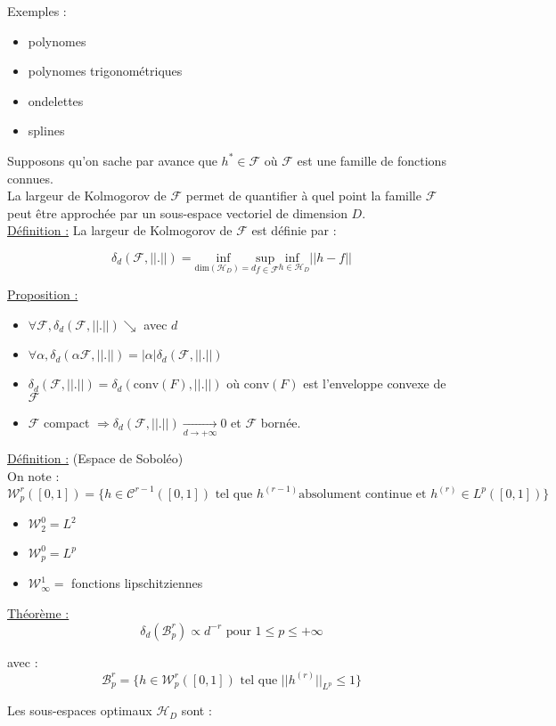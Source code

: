 \documentclass[12pt,a4paper]{article}
\begin{document}
Exemples :
\begin{itemize}
    \item polynomes
    \item polynomes trigonométriques
    \item ondelettes
    \item splines
\end{itemize}

Supposons qu'on sache par avance que $h^* \in \mathcal{F}$ où $\mathcal{F}$ est une famille de fonctions connues.\\

La largeur de Kolmogorov de $\mathcal{F}$ permet de quantifier à quel point la famille $\mathcal{F}$ peut être approchée par un sous-espace vectoriel de dimension $D$.\\

\underline{Définition :} La largeur de Kolmogorov de $\mathcal{F}$ est définie par :

$$
\delta_d(\mathcal{F}, ||.||) = \underset{\text{dim}(\mathcal{H}_D) = d}{\text{inf }} \underset{f \in \mathcal{F}}{\text{sup }} \underset{h \in \mathcal{H}_D}{\text{inf }} ||h - f||
$$


\underline{Proposition :}
\begin{itemize}
    \item $\forall \mathcal{F}, \delta_d(\mathcal{F}, ||.||) \searrow$ avec $d$
    \item $\forall \alpha, \delta_d(\alpha \mathcal{F}, ||.||) = |\alpha| \delta_d(\mathcal{F}, ||.||)$
    \item $\delta_d(\mathcal{F}, ||.||) = \delta_d(\text{conv}(F), ||.||)$ où $\text{conv}(F)$ est l'enveloppe convexe de $\mathcal{F}$
    \item $\mathcal{F}$ compact $\Rightarrow \delta_d(\mathcal{F}, ||.||) \underset{d \rightarrow + \infty}{\rightarrow}0$ et $\mathcal{F}$ bornée.
\end{itemize}

\underline{Définition :} (Espace de Soboléo)\\
On note :
$$
\mathcal{W}_{p}^{r}([0, 1]) = \{h \in \mathcal{C}^{r-1}([0, 1]) \text{ tel que } h^{(r-1)} \text{absolument continue et } h^{(r)} \in L^p([0, 1])\}
$$

\begin{itemize}
    \item $\mathcal{W}_{2}^{0} = L^2$
    \item $\mathcal{W}_{p}^{0} = L^p$
    \item $\mathcal{W}_{\infty}^{1} =$ fonctions lipschitziennes
\end{itemize}


\underline{Théorème :}
$$
\delta_d(\mathcal{B}_{p}^{r}) \propto d^{-r} \text{ pour } 1 \leq p \leq + \infty
$$

avec :
$$
\mathcal{B}_{p}^{r} = \{h \in \mathcal{W}_{p}^{r}([0, 1]) \text{ tel que } ||h^{(r)}||_{L^p} \leq 1\}
$$


Les sous-espaces optimaux $\mathcal{H}_D$ sont :
\end{document}

